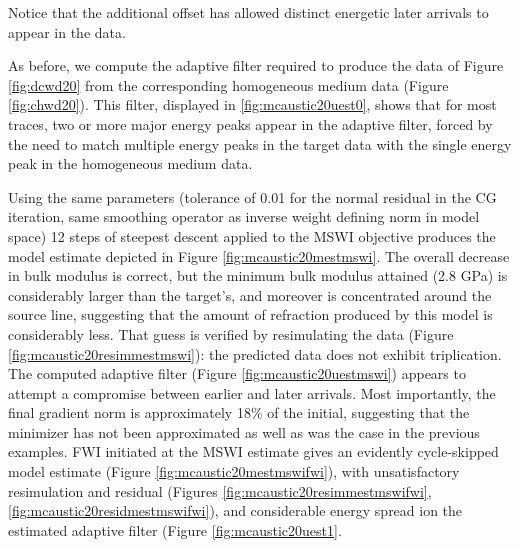 
Notice that the additional offset has allowed distinct energetic later
arrivals to appear in the data.

As before, we compute the adaptive filter required to produce the data
of Figure \ref{fig:dcwd20} from the corresponding homogeneous medium data (Figure
\ref{fig:chwd20}). This filter, displayed in \ref{fig:mcaustic20uest0},
shows that for most traces, two or more major energy peaks appear in the
adaptive filter, forced by the need to match multiple energy peaks in
the target data with the single energy peak in the homogeneous medium
data.

Using the same parameters (tolerance of 0.01 for the normal residual
in the CG iteration, same smoothing operator as inverse weight
defining norm in model space) 12 steps of steepest descent applied to
the MSWI objective produces the model
estimate depicted in Figure \ref{fig:mcaustic20mestmswi}. The overall
decrease in bulk modulus is correct, but the minimum bulk modulus attained (2.8 GPa) is considerably larger
than the target's, and moreover is concentrated around the source
line, suggesting that the amount of refraction produced by this model is
considerably less. That guess is verified by resimulating the data
(Figure \ref{fig:mcaustic20resimmestmswi}): the predicted data does not
exhibit triplication. The computed adaptive filter (Figure 
\ref{fig:mcaustic20uestmswi}) appears to attempt a compromise between
earlier and later arrivals. Most importantly, the final gradient norm
is approximately 18\% of the initial, suggesting that the minimizer has
not been approximated as well as was the case in the previous
examples. FWI initiated at the MSWI estimate gives an evidently
cycle-skipped model estimate (Figure \ref{fig:mcaustic20mestmswifwi}),
with unsatisfactory resimulation and residual (Figures
\ref{fig:mcaustic20resimmestmswifwi},
\ref{fig:mcaustic20residmestmswifwi}), and considerable energy spread
ion the estimated adaptive filter (Figure \ref{fig:mcaustic20uest1}.




